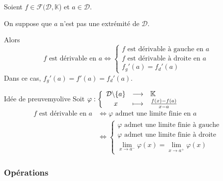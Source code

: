    \begin{prop}{}{}
        Soient $f \in \mathcal{F}(\mathcal{D}, \mathbb{K}$) et $a \in \mathcal{D}$.

        On suppose que $a$ n’est pas une extrémité de $\mathcal{D}$. 
    
        Alors \[ f \text{ est dérivable en } a \iff \left\{ \begin{array}{l} 
            f \text{ est dérivable à gauche en } a \\ 
            f \text{ est dérivable à droite en } a \\ 
            f_g'(a) = f_d'(a) 
        \end{array} \right.  \]
        Dans ce cas, $f_g'(a) = f'(a) = f_d'(a)$.
    \end{prop}

    \begin{demo}{Idée de preuve}{myolive}
        Soit $\fonction{\varphi}{\mathcal{D}\backslash \{a \}}{\mathbb{K}}{x}{\frac{f(x)-f(a)}{x-a}}$
        \begin{align*}
            f \text{ est dérivable en } a & \iff \varphi \text{ admet une limite finie en } a \\
            & \iff \left\{ \begin{array}{l}
                \varphi \text{ admet une limite finie à gauche}\\
                \varphi \text{ admet une limite finie à droite}\\
                \lim\limits_{x \rightarrow a^-} \varphi(x) = \lim\limits_{x \rightarrow a^+} \varphi(x) 
            \end{array} \right.
        \end{align*}
    \end{demo}

    \subsubsection{Opérations}

